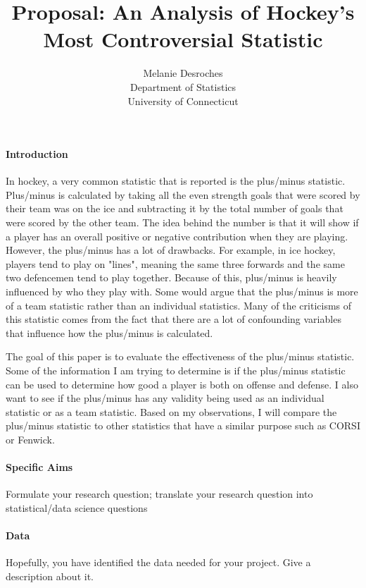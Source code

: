 \documentclass[12pt]{article}
\title{Proposal: An Analysis of Hockey's Most Controversial Statistic}
\author{Melanie Desroches\\
  Department of Statistics\\
  University of Connecticut
}
\begin{document}
\maketitle


\paragraph{Introduction}
In hockey, a very common statistic that is reported is the plus/minus statistic. Plus/minus is calculated
by taking all the even strength goals that were scored by their team was on the ice and subtracting it by 
the total number of goals that were scored by the other team. The idea behind the number is that it will 
show if a player has an overall positive or negative contribution when they are playing. However, the plus/minus
has a lot of drawbacks. For example, in ice hockey, players tend to play on "lines", meaning the same three 
forwards and the same two defencemen tend to play together. Because of this, plus/minus is heavily influenced 
by who they play with. Some would argue that the plus/minus is more of a team statistic rather than an individual 
statistics. Many of the criticisms of this statistic comes from the fact that there are a lot of confounding 
variables that influence how the plus/minus is calculated. 

The goal of this paper is to evaluate the effectiveness of the plus/minus statistic. Some of the information
I am trying to determine is if the plus/minus statistic can be used to determine how good a player is both on
offense and defense. I also want to see if the plus/minus has any validity being used as an individual
statistic or as a team statistic. Based on my observations, I will compare the plus/minus statistic to other
statistics that have a similar purpose such as CORSI or Fenwick.

\paragraph{Specific Aims}
Formulate your research question;
translate your research question into statistical/data science questions

\lipsum[2]

\paragraph{Data}
Hopefully, you have identified the data needed for your project. Give a
description about it.
\end{document}
